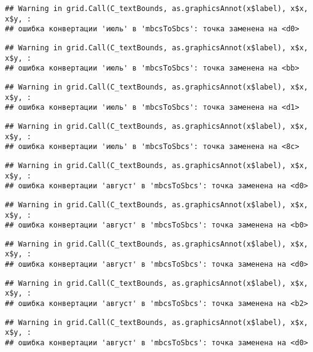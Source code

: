 \documentclass[
]{article}
\begin{document}
\begin{verbatim}
## Warning in grid.Call(C_textBounds, as.graphicsAnnot(x$label), x$x, x$y, :
## ошибка конвертации 'июль' в 'mbcsToSbcs': точка заменена на <d0>
\end{verbatim}

\begin{verbatim}
## Warning in grid.Call(C_textBounds, as.graphicsAnnot(x$label), x$x, x$y, :
## ошибка конвертации 'июль' в 'mbcsToSbcs': точка заменена на <bb>
\end{verbatim}

\begin{verbatim}
## Warning in grid.Call(C_textBounds, as.graphicsAnnot(x$label), x$x, x$y, :
## ошибка конвертации 'июль' в 'mbcsToSbcs': точка заменена на <d1>
\end{verbatim}

\begin{verbatim}
## Warning in grid.Call(C_textBounds, as.graphicsAnnot(x$label), x$x, x$y, :
## ошибка конвертации 'июль' в 'mbcsToSbcs': точка заменена на <8c>
\end{verbatim}

\begin{verbatim}
## Warning in grid.Call(C_textBounds, as.graphicsAnnot(x$label), x$x, x$y, :
## ошибка конвертации 'август' в 'mbcsToSbcs': точка заменена на <d0>
\end{verbatim}

\begin{verbatim}
## Warning in grid.Call(C_textBounds, as.graphicsAnnot(x$label), x$x, x$y, :
## ошибка конвертации 'август' в 'mbcsToSbcs': точка заменена на <b0>
\end{verbatim}

\begin{verbatim}
## Warning in grid.Call(C_textBounds, as.graphicsAnnot(x$label), x$x, x$y, :
## ошибка конвертации 'август' в 'mbcsToSbcs': точка заменена на <d0>
\end{verbatim}

\begin{verbatim}
## Warning in grid.Call(C_textBounds, as.graphicsAnnot(x$label), x$x, x$y, :
## ошибка конвертации 'август' в 'mbcsToSbcs': точка заменена на <b2>
\end{verbatim}

\begin{verbatim}
## Warning in grid.Call(C_textBounds, as.graphicsAnnot(x$label), x$x, x$y, :
## ошибка конвертации 'август' в 'mbcsToSbcs': точка заменена на <d0>
\end{verbatim}
\end{document}
